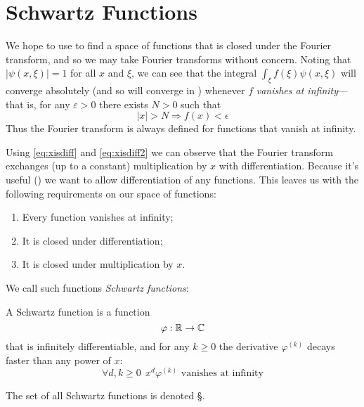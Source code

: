     \section{Schwartz Functions}
      We hope to use  to find a space of functions that is closed under the Fourier transform, and so we may take Fourier transforms without concern.
      Noting that $|\psi(x,\xi)|=1$ for all $x$ and $\xi$, we can see that the integral $\int_\xi f(\xi)\psi(x,\xi)$ will converge absolutely (and so will converge in \R) whenever $f$ \emph{vanishes at infinity}---that is, for any $\varepsilon>0$ there exists $N>0$ such that
      \begin{equation*}
        |x|>N \Rightarrow f(x)<\epsilon
      \end{equation*}
      Thus the Fourier transform is always defined for functions that vanish at infinity.

      Using \eqref{eq:xisdiff} and \eqref{eq:xisdiff2} we can observe that the Fourier transform exchanges (up to a constant) multiplication by $x$ with differentiation. 
      Because it's useful () we want to allow differentiation of any functions.
      This leaves us with the following requirements on our space of functions:
      \begin{enumerate}[label=(\alph*)]
        \item \label{i:vanish}Every function vanishes at infinity;
        \item \label{i:diff}It is closed under differentiation;
        \item \label{i:mult}It is closed under multiplication by $x$.
      \end{enumerate}
      We call such functions \emph{Schwartz functions}:


      \begin{defn}
        A Schwartz function is a function
        \begin{equation*}
          \varphi:\mathbb{R}\rightarrow\mathbb{C}
        \end{equation*}
        that is infinitely differentiable, and for any $k\ge0$ the derivative $\varphi^{(k)}$ decays faster than any power of $x$:
        \begin{equation*}
          \forall d,k\ge0\ \ x^d\varphi^{(k)}\text{ vanishes at infinity}
        \end{equation*}

        The set of all Schwartz functions is denoted \S.
      \end{defn}

